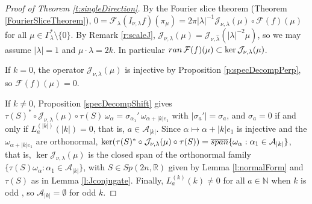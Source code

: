 \documentclass[11pt]{amsart}
\theoremstyle{plain}
\theoremstyle{definition}
\theoremstyle{remark}
\numberwithin{equation}{section}
\def\cA{\mathcal{A}}
\def\cJ{\mathcal{J}}
\def\cF{\mathcal{F}}
\def\mz{\setminus\{0\}}
\def\R{{\mathbb R}}%
\def\N{{\mathbb N}}%
\numberwithin{equation}{section}
\begin{document}
\begin{proof}[Proof of Theorem \ref{t:singleDirection}]
	By the Fourier slice theorem (Theorem \ref{FourierSliceTheorem}), $0=\cF_\lambda(I_{\nu, \lambda}f)(\pi_\mu)=2\pi|\lambda|^{-1}\cJ_{\nu, \lambda}(\mu)\circ\cF(f)(\mu)$ for all $\mu\in \Gamma_\lambda^*\mz$. By Remark \ref{r:scaleJ}, $\cJ_{\nu, \lambda}(\mu)=\cJ_{\nu, \hat\lambda}(|\lambda|^{-2}\mu)$, so we may assume $|\lambda|=1$ and $\mu\cdot\lambda=2k$. In particular ${\rm ran}\,\cF(f)(\mu)\subset\ker\cJ_{\nu, \lambda}(\mu)$.

	If $k=0$, the operator $\cJ_{\nu, \lambda}(\mu)$ is injective by Proposition \ref{p:specDecompPerp}, so $\cF(f)(\mu)=0$.

	If $k\neq0$, Proposition \ref{specDecompShift} gives $\tau(S)^*\circ\cJ_{\nu, \lambda}(\mu)\circ\tau(S)\,\omega_\alpha=\sigma_{\alpha_1}'\,\omega_{\alpha+|k|e_1}$ with $|\sigma_a'|=\sigma_a$, and $\sigma_a=0$ if and only if $L_a^{(|k|)}(|k|)=0$, that is, $a\in \cA_{|k|}$. Since $\alpha\mapsto\alpha+|k|e_1$ is injective and the $\omega_{\alpha+|k|e_1}$ are orthonormal, $\ker(\tau(S)^*\circ\cJ_{\nu, \lambda}(\mu)\circ\tau(S))=\overline{\rm span}\{\omega_\alpha: \alpha_1\in \cA_{|k|}\}$, that is, $\ker\cJ_{\nu, \lambda}(\mu)$ is the closed span of the orthonormal family $\{\tau(S)\omega_\alpha: \alpha_1\in \cA_{|k|}\}$, with $S\in Sp(2n, \R)$ given by Lemma \ref{l:normalForm} and $\tau(S)$ as in Lemma \ref{l:Jconjugate}. Finally, $L_a^{(k)}(k)\neq0$ for all $a\in \N$ when $k$ is odd \cite{flynnInjectivityHeisenbergXray2021}, so $\cA_{|k|}=\emptyset$ for odd $k$.
\end{proof}
\end{document}

